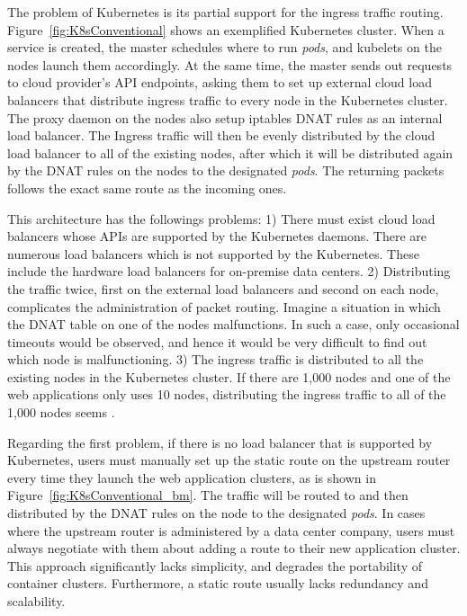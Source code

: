 The problem of Kubernetes is its partial support for the ingress traffic routing.
Figure~\ref{fig:K8sConventional} shows an exemplified Kubernetes cluster.
When a service is created, the master schedules where to run {\em pods}, and kubelets on the nodes launch them accordingly.
At the same time, the master sends out requests to cloud provider's API endpoints, asking them to set up external cloud load balancers that distribute ingress traffic to every node in the Kubernetes cluster.
The proxy daemon on the nodes also setup iptables DNAT \cite{MartinA.Brown2017} rules as an internal load balancer. 
The Ingress traffic will then be evenly distributed by the cloud load balancer to all of the existing nodes, 
after which it will be distributed again by the DNAT rules on the nodes to the designated {\em pods}. 
The returning packets follows the exact same route as the incoming ones.

This architecture has the followings problems: 
1) There must exist cloud load balancers whose APIs are supported by the Kubernetes daemons.
There are numerous load balancers which is not supported by the Kubernetes.
These include the hardware load balancers for on-premise data centers.
2) Distributing the traffic twice, first on the external load balancers and second on each node, complicates the administration of packet routing. 
Imagine a situation in which the DNAT table on one of the nodes malfunctions.
In such a case, only occasional timeouts would be observed, and hence it would be very difficult to find out which node is malfunctioning.   
3) The ingress traffic is distributed to all the existing nodes in the Kubernetes cluster. 
If there are 1,000 nodes and one of the web applications only uses 10 nodes, distributing the ingress traffic to all of the 1,000 nodes seems .

Regarding the first problem, if there is no load balancer that is supported by Kubernetes, users must manually set up the static route on the upstream router\deleted[id=5th]{,} every time they launch the web application clusters, as is shown in Figure~\ref{fig:K8sConventional_bm}.
The traffic will be routed to  and then distributed by the DNAT rules on the node to the designated {\em pods}.
In cases where the upstream router is administered by a data center company, users must always negotiate with them about adding a route to their new application cluster.
This approach significantly lacks simplicity, and degrades the portability of container clusters.
Furthermore, a static route usually lacks redundancy and scalability.

